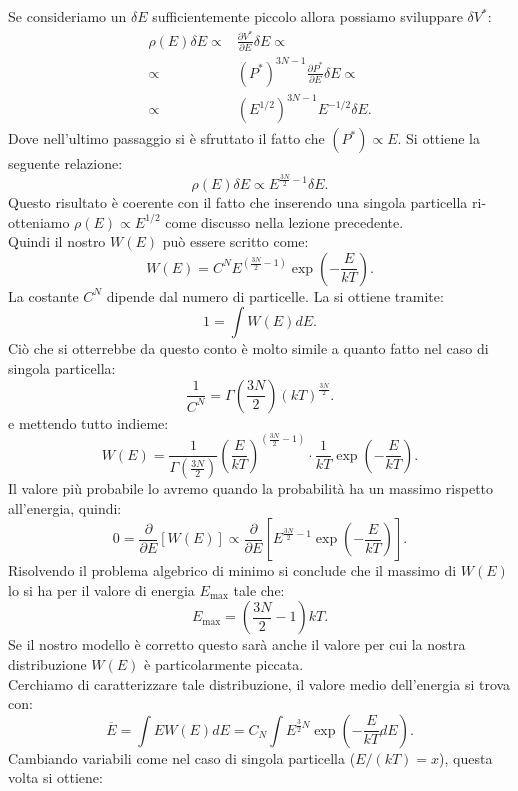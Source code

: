 Se consideriamo un $\delta E$ sufficientemente piccolo allora possiamo sviluppare $\delta V^{*}$:
\begin{align}
	\rho\left( E \right) \delta E \propto& \frac{\partial V^*}{\partial E}\delta E  \propto\\
	\propto &\left( P^* \right) ^{3N-1}\frac{\partial P^*}{\partial E} \delta E \propto\\
	\propto &\left( E^{1 / 2} \right) ^{3N-1}E^{- 1 / 2} \delta E
.\end{align}
Dove nell'ultimo passaggio si è sfruttato il fatto che $\left( P^{*} \right) \propto E$. Si ottiene la seguente relazione: 
\[
	\rho\left( E \right) \delta E \propto E ^{\frac{3N}{2} -1}\delta E 
.\] 
Questo risultato è coerente con il fatto che inserendo una singola particella ri-otteniamo $\rho\left( E \right) \propto E^{1 /2}$ come discusso nella lezione precedente.\\
Quindi il nostro $W \left( E \right) $ può essere scritto come:
\[
	W\left( E \right)  = C^{N} E^{\left( \frac{3N}{2}-1 \right)}\exp\left( -\frac{E}{kT} \right) 
.\] 
La costante $C^{N}$ dipende dal numero di particelle. La si ottiene tramite:
\[
	1 = \int W\left( E \right) dE
.\] Ciò che si otterrebbe da questo conto è molto simile a quanto fatto nel caso di singola particella:
\[
	\frac{1}{C^{N}}= \Gamma \left( \frac{3N}{2} \right) \left( kT \right) ^{\frac{3N}{2}}
.\] 
e mettendo tutto indieme:
\[
	W\left( E \right) = \frac{1}{\Gamma\left( \frac{3N}{2} \right) }\left( \frac{E}{kT} \right) ^{\left( \frac{3N}{2}-1 \right) }\cdot 
	\frac{1}{kT}\exp\left( -\frac{E}{kT} \right) 
.\] 
Il valore più probabile lo avremo quando la probabilità ha un massimo rispetto all'energia, quindi:
\[
	0 = \frac{\partial }{\partial E} \left[ W\left( E \right) \right] \propto \frac{\partial }{\partial E} \left[ E^{\frac{3N}{2}-1} \exp\left( -\frac{E}{kT} \right) \right] 
.\] 
Risolvendo il problema algebrico di minimo si conclude che il massimo di $W\left( E \right)$ lo si ha per il valore di energia $E_{\text{max}}$ tale che:
\[
	E_{\text{max}} = \left( \frac{3N}{2}-1 \right) kT
.\] 
Se il nostro modello è corretto questo sarà anche il valore per cui la nostra distribuzione $W\left( E \right)$ è particolarmente piccata. \\
Cerchiamo di caratterizzare tale distribuzione, il valore medio dell'energia si trova con:
\[
	\overline{E} = \int E W\left( E \right) dE = C_{N} \int E^{\frac{3}{2}N}\exp\left( -\frac{E}{kT} dE \right) 
.\] 
Cambiando variabili come nel caso di singola particella ($E /( kT )=x$), questa volta si ottiene:
